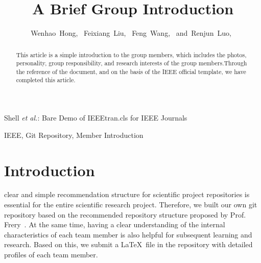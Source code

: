 \documentclass[journal]{IEEEtran}
\begin{document}
\title{A Brief Group Introduction}

\author{Wenhao~Hong,~
        Feixiang~Liu,~
        Feng~Wang,~
        and~Renjun~Luo,~%
}


%
{Shell \MakeLowercase{\textit{et al.}}: Bare Demo of IEEEtran.cls for IEEE Journals}




\maketitle

\begin{abstract}
	This article is a simple introduction to the group members, which includes the photos, personality, group responsibility, and research interests of the group members.Through the reference of the document, and on the basis of the IEEE official template, we have completed this article.
\end{abstract}

\begin{IEEEkeywords}
IEEE, Git Repository, Member Introduction
\end{IEEEkeywords}




\IEEEpeerreviewmaketitle



\section{Introduction}


 clear and simple recommendation structure for scientific project repositories is essential for the entire scientific research project. Therefore, we built our own git repository based on the recommended repository structure proposed by Prof. Frery~\cite{2020A}.
At the same time, having a clear understanding of the internal characteristics of each team member is also helpful for subsequent learning and research.
Based on this, we submit a \LaTeX\ file in the repository with detailed profiles of each team member.
\end{document}
